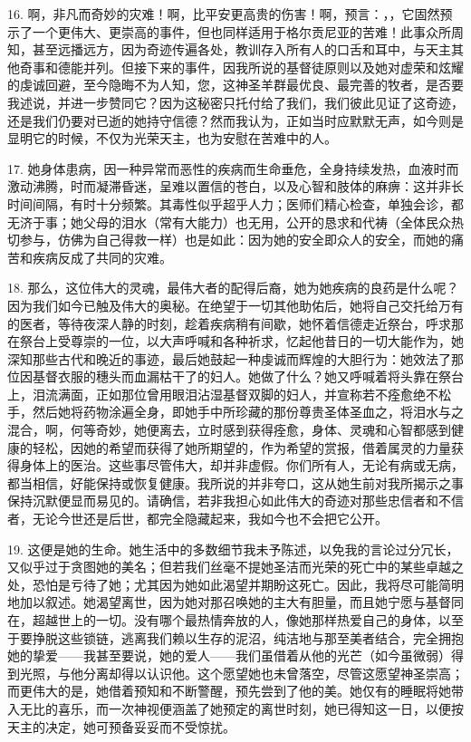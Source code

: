 16. 啊，非凡而奇妙的灾难！啊，比平安更高贵的伤害！啊，预言：，，它固然预示了一个更伟大、更崇高的事件，但也同样适用于格尔贡尼亚的苦难！此事众所周知，甚至远播远方，因为奇迹传遍各处，教训存入所有人的口舌和耳中，与天主其他奇事和德能并列。但接下来的事件，因我所说的基督徒原则以及她对虚荣和炫耀的虔诚回避，至今隐晦不为人知，您，这神圣羊群最优良、最完善的牧者，是否要我述说，并进一步赞同它？因为这秘密只托付给了我们，我们彼此见证了这奇迹，还是我们仍要对已逝的她持守信德？然而我认为，正如当时应默默无声，如今则是显明它的时候，不仅为光荣天主，也为安慰在苦难中的人。\par

17. 她身体患病，因一种异常而恶性的疾病而生命垂危，全身持续发热，血液时而激动沸腾，时而凝滞昏迷，呈难以置信的苍白，以及心智和肢体的麻痹：这并非长时间间隔，有时十分频繁。其毒性似乎超乎人力；医师们精心检查，单独会诊，都无济于事；她父母的泪水（常有大能力）也无用，公开的恳求和代祷（全体民众热切参与，仿佛为自己得救一样）也是如此：因为她的安全即众人的安全，而她的痛苦和疾病反成了共同的灾难。\par

18. 那么，这位伟大的灵魂，最伟大者的配得后裔，她为她疾病的良药是什么呢？因为我们如今已触及伟大的奥秘。在绝望于一切其他助佑后，她将自己交托给万有的医者，等待夜深人静的时刻，趁着疾病稍有间歇，她怀着信德走近祭台，呼求那在祭台上受尊崇的一位，以大声呼喊和各种祈求，忆起他昔日的一切大能作为，她深知那些古代和晚近的事迹，最后她鼓起一种虔诚而辉煌的大胆行为：她效法了那位因基督衣服的穗头而血漏枯干了的妇人。她做了什么？她又呼喊着将头靠在祭台上，泪流满面，正如那位曾用眼泪沾湿基督双脚的妇人，并宣称若不痊愈绝不松手，然后她将药物涂遍全身，即她手中所珍藏的那份尊贵圣体圣血之，将泪水与之混合，啊，何等奇妙，她便离去，立时感到获得痊愈，身体、灵魂和心智都感到健康的轻松，因她的希望而获得了她所期望的，作为希望的赏报，借着属灵的力量获得身体上的医治。这些事尽管伟大，却并非虚假。你们所有人，无论有病或无病，都当相信，好能保持或恢复健康。我所说的并非夸口，这从她生前对我所揭示之事保持沉默便显而易见的。请确信，若非我担心如此伟大的奇迹对那些忠信者和不信者，无论今世还是后世，都完全隐藏起来，我如今也不会把它公开。\par

19. 这便是她的生命。她生活中的多数细节我未予陈述，以免我的言论过分冗长，又似乎过于贪图她的美名；但若我们丝毫不提她圣洁而光荣的死亡中的某些卓越之处，恐怕是亏待了她；尤其因为她如此渴望并期盼这死亡。因此，我将尽可能简明地加以叙述。她渴望离世，因为她对那召唤她的主大有胆量，而且她宁愿与基督同在，超越世上的一切。没有哪个最热情奔放的人，像她那样热爱自己的身体，以至于要挣脱这些锁链，逃离我们赖以生存的泥沼，纯洁地与那至美者结合，完全拥抱她的挚爱——我甚至要说，她的爱人——我们虽借着从他的光芒（如今虽微弱）得到光照，与他分离却得以认识他。这个愿望她也未曾落空，尽管这愿望神圣崇高；而更伟大的是，她借着预知和不断警醒，预先尝到了他的美。她仅有的睡眠将她带入无比的喜乐，而一次神视便涵盖了她预定的离世时刻，她已得知这一日，以便按天主的决定，她可预备妥妥而不受惊扰。\par

